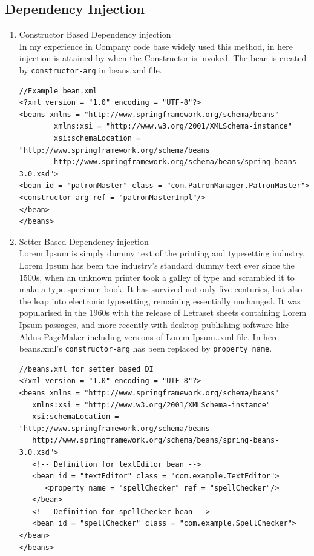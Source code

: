 \documentclass[12pt,a4paper]{report}
\begin{document}
\subsection*{Dependency Injection}
\begin{enumerate}
\item Constructor Based Dependency injection\\
In my experience in Company code base widely used this method, in here injection is attained by when the Constructor is invoked. The bean is created by \texttt{constructor-arg} in beans.xml file.
\begin{lstlisting}
//Example bean.xml
<?xml version = "1.0" encoding = "UTF-8"?>
<beans xmlns = "http://www.springframework.org/schema/beans"
        xmlns:xsi = "http://www.w3.org/2001/XMLSchema-instance"
        xsi:schemaLocation = "http://www.springframework.org/schema/beans
        http://www.springframework.org/schema/beans/spring-beans-3.0.xsd">
<bean id = "patronMaster" class = "com.PatronManager.PatronMaster">
<constructor-arg ref = "patronMasterImpl"/>
</bean>
</beans>
\end{lstlisting}

\item Setter Based Dependency injection\\
Lorem Ipsum is simply dummy text of the printing and typesetting industry. Lorem Ipsum has been the industry's standard dummy text ever since the 1500s, when an unknown printer took a galley of type and scrambled it to make a type specimen book. It has survived not only five centuries, but also the leap into electronic typesetting, remaining essentially unchanged. It was popularised in the 1960s with the release of Letraset sheets containing Lorem Ipsum passages, and more recently with desktop publishing software like Aldus PageMaker including versions of Lorem Ipsum..xml file. In here beans.xml's \texttt{constructor-arg} has been replaced by \texttt{property name}.

\begin{lstlisting}
//beans.xml for setter based DI
<?xml version = "1.0" encoding = "UTF-8"?>
<beans xmlns = "http://www.springframework.org/schema/beans"
   xmlns:xsi = "http://www.w3.org/2001/XMLSchema-instance"
   xsi:schemaLocation = "http://www.springframework.org/schema/beans
   http://www.springframework.org/schema/beans/spring-beans-3.0.xsd">
   <!-- Definition for textEditor bean -->
   <bean id = "textEditor" class = "com.example.TextEditor">
      <property name = "spellChecker" ref = "spellChecker"/>
   </bean>
   <!-- Definition for spellChecker bean -->
   <bean id = "spellChecker" class = "com.example.SpellChecker"></bean>
</beans>
\end{lstlisting}
\end{enumerate}
\newpage
\end{document}
